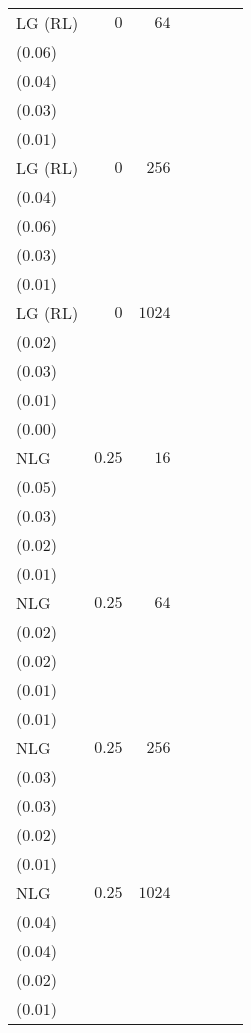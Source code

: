 \begin{table}[t]
\begin{tabular}{lrrrrrr}
LG {\scriptsize(RL)} & \(0\) & \(64\) & \longcell{\(0.50\)\\{\tiny(\(0.06\))}} & \longcell{\(0.20\)\\{\tiny(\(0.04\))}} & \longcell{\(0.05\)\\{\tiny(\(0.03\))}} & \longcell{\(0.01\)\\{\tiny(\(0.01\))}} \\[2.2ex]
LG {\scriptsize(RL)} & \(0\) & \(256\) & \longcell{\(0.64\)\\{\tiny(\(0.04\))}} & \longcell{\(0.26\)\\{\tiny(\(0.06\))}} & \longcell{\(0.06\)\\{\tiny(\(0.03\))}} & \longcell{\(0.01\)\\{\tiny(\(0.01\))}} \\[2.2ex]
LG {\scriptsize(RL)} & \(0\) & \(1024\) & \longcell{\(0.71\)\\{\tiny(\(0.02\))}} & \longcell{\(0.28\)\\{\tiny(\(0.03\))}} & \longcell{\(0.06\)\\{\tiny(\(0.01\))}} & \longcell{\(0.01\)\\{\tiny(\(0.00\))}} \\[2.2ex]
NLG & \(0.25\) & \(16\) & \longcell{\(0.26\)\\{\tiny(\(0.05\))}} & \longcell{\(0.22\)\\{\tiny(\(0.03\))}} & \longcell{\(0.15\)\\{\tiny(\(0.02\))}} & \longcell{\(0.06\)\\{\tiny(\(0.01\))}} \\[2.2ex]
NLG & \(0.25\) & \(64\) & \longcell{\(0.48\)\\{\tiny(\(0.02\))}} & \longcell{\(0.41\)\\{\tiny(\(0.02\))}} & \longcell{\(0.28\)\\{\tiny(\(0.01\))}} & \longcell{\(0.11\)\\{\tiny(\(0.01\))}} \\[2.2ex]
NLG & \(0.25\) & \(256\) & \longcell{\(0.65\)\\{\tiny(\(0.03\))}} & \longcell{\(0.56\)\\{\tiny(\(0.03\))}} & \longcell{\(0.39\)\\{\tiny(\(0.02\))}} & \longcell{\(0.15\)\\{\tiny(\(0.01\))}} \\[2.2ex]
NLG & \(0.25\) & \(1024\) & \longcell{\(0.69\)\\{\tiny(\(0.04\))}} & \longcell{\(0.61\)\\{\tiny(\(0.04\))}} & \longcell{\(0.44\)\\{\tiny(\(0.02\))}} & \longcell{\(0.16\)\\{\tiny(\(0.01\))}} \\[2.2ex]

\end{tabular}
\end{table}
